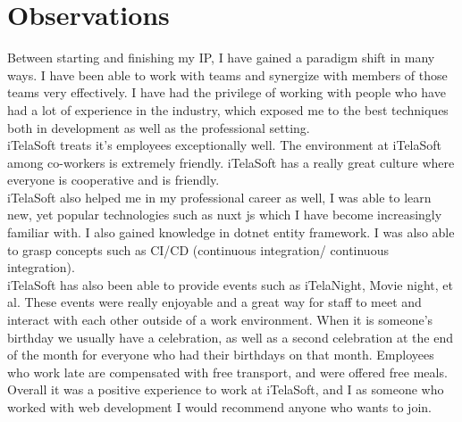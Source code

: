 \documentclass[12pt]{article}
\begin{document}
\section{Observations}
Between starting and finishing my IP, I have gained a paradigm shift in many ways. I have been able to work with teams
and synergize with members of those teams very effectively. I have had the privilege of working with people who 
have had a lot of experience in the industry, which exposed me to the best techniques both in development as well
as the professional setting.\\
\newline
iTelaSoft treats it's employees exceptionally well. The environment at iTelaSoft among co-workers
is extremely friendly. iTelaSoft has a really great culture where everyone is cooperative and is friendly.\\
\newline
iTelaSoft also helped me in my professional career as well, I was able to learn new, yet popular technologies
such as nuxt js which I have become increasingly familiar with. I also gained knowledge in dotnet entity framework.
I was also able to grasp concepts such as CI/CD (continuous integration/ continuous integration).\\
\newline
iTelaSoft has also been able to provide events such as iTelaNight, Movie night, et al. These events were really
enjoyable and a great way for staff to meet and interact with each other outside of a work environment. When it 
is someone's birthday we usually have a celebration, as well as a second celebration at the end of the month for 
everyone who had their birthdays on that month. Employees who work late are compensated with free transport, and 
were offered free meals. Overall it was a positive experience to work at iTelaSoft, and I as someone who worked 
with web development I would recommend anyone who wants to join.\\
\newpage


\end{document}
